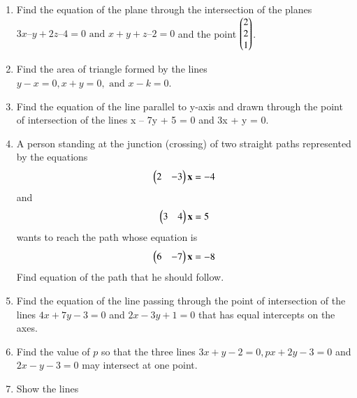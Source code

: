 \begin{enumerate}[label=\thesubsection.\arabic*,ref=\thesubsection.\theenumi]
	\item  Find the equation of the plane through the intersection of the planes $3{x} – {y} + 2{z} – 4 = 0 \text{ and } {x} + {y} + {z} – 2 = 0$ and the point $\begin{pmatrix}2\\2\\1\end{pmatrix}$.
		\label{prob:12/11/3/9/plane}
		\\
    \solution
		
	\item Find the area of triangle formed by the lines $y-x=0, x+y=0, \text{ and } x-k=0$.
		\\
\solution
		
	\item  Find the equation of the line parallel to y-axis and drawn through the point of
intersection of the lines x – 7y + 5 = 0 and 3x + y = 0.
\\
\solution
		
    \item A person standing at the junction (crossing) of two straight paths 
    represented by the equations 
    \begin{align}
        \begin{pmatrix}2&-3\end{pmatrix}\mathbf{x} = -4 
        \label{eq:chapters/11/10/4/24/L1}
    \end{align}
    and
    \begin{align}
        \begin{pmatrix}3&4\end{pmatrix}\mathbf{x} = 5
        \label{eq:chapters/11/10/4/24/L2}
    \end{align} 
    wants to reach the path whose equation is 
    \begin{align}
        \begin{pmatrix}6&-7\end{pmatrix}\mathbf{x} = -8
        \label{eq:chapters/11/10/4/24/L3}
    \end{align}
    Find equation of the path that he should follow.
\\
    \solution 
		
	\item Find the equation of the line passing through the point of intersection of the lines $4x + 7y - 3 = 0$ and $2x - 3y + 1 = 0$ that has equal intercepts on the axes.\\
	\solution 
	  
\item
Find the value of $p$ so that the three lines $3x+y-2=0, px+2y-3=0$ and $2x-y-3=0$ may intersect at one point.
\label{11.10.4.9}
\\
\solution

\item Show the lines

\end{enumerate}
